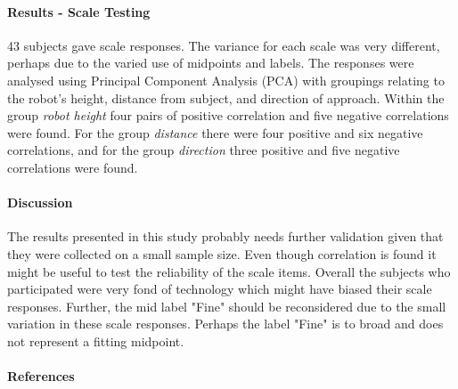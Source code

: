 \documentclass[a4paper]{article}
\begin{document}
\paragraph{Results - Scale Testing}
43 subjects gave scale responses. The variance for each scale was very different, perhaps due to the varied use of midpoints and labels. The responses were analysed using Principal Component Analysis (PCA) with groupings relating to the robot's height, distance from subject, and direction of approach. Within the group \textit{robot height} four pairs of positive correlation and five negative correlations were found. For the group \textit{distance} there were four positive and six negative correlations, and for the group \textit{direction} three positive and five negative correlations were found. 

\paragraph{Discussion}
The results presented in this study probably needs further validation given that they were collected on a small sample size. Even though correlation is found it might be useful to test the reliability of the scale items. Overall the subjects who participated were very fond of technology which might have biased their scale responses. Further, the mid label "Fine" should be reconsidered due to the small variation in these scale responses. Perhaps the label "Fine" is to broad and does not represent a fitting midpoint. 

\paragraph{References}
\end{document}
